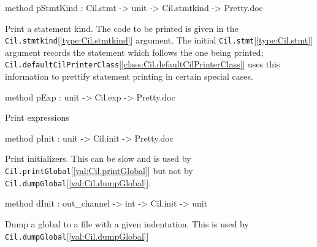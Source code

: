 \documentclass[11pt]{article}
\begin{document}
\begin{ocamldocobjectend}
\begin{ocamldocdescription}
\end{ocamldocdescription}


\label{method:Cil.cilPrinter.pStmtKind}\begin{ocamldoccode}
method pStmtKind : Cil.stmt -> unit -> Cil.stmtkind -> Pretty.doc
\end{ocamldoccode}
\begin{ocamldocdescription}
Print a statement kind. The code to be printed is given in the
 {\tt{Cil.stmtkind}}[\ref{type:Cil.stmtkind}] argument.  The initial {\tt{Cil.stmt}}[\ref{type:Cil.stmt}] argument
 records the statement which follows the one being printed;
 {\tt{Cil.defaultCilPrinterClass}}[\ref{class:Cil.defaultCilPrinterClass}] uses this information to prettify
 statement printing in certain special cases.


\end{ocamldocdescription}


\label{method:Cil.cilPrinter.pExp}\begin{ocamldoccode}
method pExp : unit -> Cil.exp -> Pretty.doc
\end{ocamldoccode}
\begin{ocamldocdescription}
Print expressions


\end{ocamldocdescription}


\label{method:Cil.cilPrinter.pInit}\begin{ocamldoccode}
method pInit : unit -> Cil.init -> Pretty.doc
\end{ocamldoccode}
\begin{ocamldocdescription}
Print initializers. This can be slow and is used by 
 {\tt{Cil.printGlobal}}[\ref{val:Cil.printGlobal}] but not by {\tt{Cil.dumpGlobal}}[\ref{val:Cil.dumpGlobal}].


\end{ocamldocdescription}


\label{method:Cil.cilPrinter.dInit}\begin{ocamldoccode}
method dInit : out_channel -> int -> Cil.init -> unit
\end{ocamldoccode}
\begin{ocamldocdescription}
Dump a global to a file with a given indentation. This is used by 
 {\tt{Cil.dumpGlobal}}[\ref{val:Cil.dumpGlobal}]


\end{ocamldocdescription}
\end{ocamldocobjectend}
\end{document}
